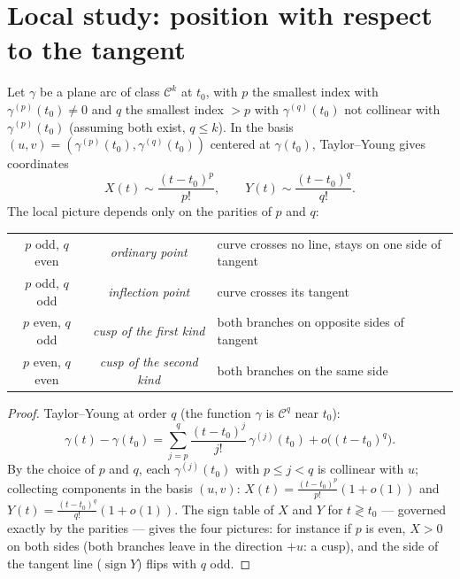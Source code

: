 \section{Local study: position with respect to the tangent}

\begin{proposition}\label{prop:b2:curves:local}
Let $\gamma$ be a plane arc of class $\mathcal{C}^k$ at $t_0$, with
$p$ the smallest index with $\gamma^{(p)}(t_0) \neq 0$ and $q$ the
smallest index $> p$ with $\gamma^{(q)}(t_0)$ not collinear with
$\gamma^{(p)}(t_0)$ (assuming both exist, $q \leq k$). In the basis
$(u, v) = (\gamma^{(p)}(t_0), \gamma^{(q)}(t_0))$ centered at
$\gamma(t_0)$, Taylor--Young gives coordinates
\[
X(t) \sim \frac{(t - t_0)^p}{p!},
\qquad
Y(t) \sim \frac{(t - t_0)^q}{q!} .
\]
The local picture depends only on the parities of $p$ and $q$:
\begin{center}
\begin{tabular}{c c l}
$p$ odd, $q$ even & \emph{ordinary point} & curve crosses no line,
stays on one side of tangent\\
$p$ odd, $q$ odd & \emph{inflection point} & curve crosses its
tangent\\
$p$ even, $q$ odd & \emph{cusp of the first kind} & both branches
on opposite sides of tangent\\
$p$ even, $q$ even & \emph{cusp of the second kind} & both
branches on the same side\\
\end{tabular}
\end{center}
\end{proposition}

\begin{proof}
Taylor--Young at order $q$ (the function $\gamma$ is
$\mathcal{C}^q$ near $t_0$):
\[
\gamma(t) - \gamma(t_0)
= \sum_{j=p}^{q} \frac{(t-t_0)^j}{j!}\,\gamma^{(j)}(t_0)
+ o\bigl((t-t_0)^q\bigr).
\]
By the choice of $p$ and $q$, each $\gamma^{(j)}(t_0)$ with $p
\leq j < q$ is collinear with $u$; collecting components in the
basis $(u, v)$: $X(t) = \frac{(t-t_0)^p}{p!}(1 + o(1))$ and
$Y(t) = \frac{(t-t_0)^q}{q!}(1 + o(1))$. The sign table of $X$ and
$Y$ for $t \gtrless t_0$ --- governed exactly by the parities ---
gives the four pictures: for instance if $p$ is even, $X > 0$ on
both sides (both branches leave in the direction $+u$: a cusp),
and the side of the tangent line ($\operatorname{sign} Y$) flips
with $q$ odd.
\end{proof}

